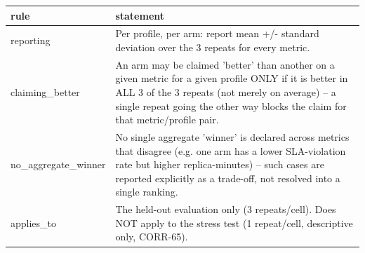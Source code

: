 \begin{tabular}{p{3cm}p{12cm}}
\hline
rule & statement \\
\hline
reporting & Per profile, per arm: report mean +/- standard deviation over the 3 repeats for every metric. \\
claiming\_better & An arm may be claimed 'better' than another on a given metric for a given profile ONLY if it is better in ALL 3 of the 3 repeats (not merely on average) -- a single repeat going the other way blocks the claim for that metric/profile pair. \\
no\_aggregate\_winner & No single aggregate 'winner' is declared across metrics that disagree (e.g. one arm has a lower SLA-violation rate but higher replica-minutes) -- such cases are reported explicitly as a trade-off, not resolved into a single ranking. \\
applies\_to & The held-out evaluation only (3 repeats/cell). Does NOT apply to the stress test (1 repeat/cell, descriptive only, CORR-65). \\
\hline
\end{tabular}
